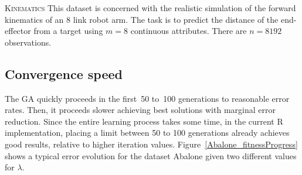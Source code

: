 \documentclass[draft,authoryear,3p,times,twocolumn]{elsarticle}
\begin{document}
\begin{description}

\item{\textsc{Kinematics}} This dataset is concerned with the realistic simulation of the forward kinematics of an 8 link robot arm. The task is to predict the distance of the end-effector from a target using $m=8$ continuous attributes. There are $n=8192$ observations. 


\end{description}

\subsection{Convergence speed}

The \ac{GA} quickly proceeds in the first~50 to~100 generations to reasonable error rates. Then, it proceeds slower achieving best solutions with marginal error reduction. Since the entire learning process takes some time, in the current R implementation, placing a limit between 50 to 100 generations already achieves good results, relative to higher iteration values. Figure~\ref{Abalone_fitnessProgress} shows a typical error evolution for the dataset Abalone given two different values for $\lambda$.

\begin{figure*}[tb]
\begin{center}
\caption{Error progress for Abalone dataset during a single execution of the genetic algorithm. The figure shows the fitness evolution for two different regularization values. The population for both consisted of $200$ polynomials. The error values seem to stabilize around iteration~250.}
\label{Abalone_fitnessProgress}

\end{center}
\end{figure*}
\end{document}
